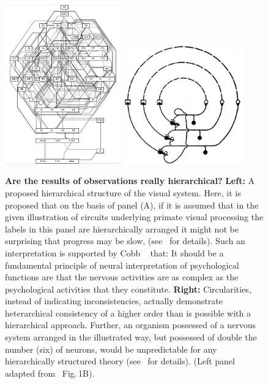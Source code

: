 \documentclass[10pt,letterpaper]{article}
\begin{document}
\begin{figure}[h!t]
  \begin{center}
  \vfill{}
    \includegraphics[width=0.45\textwidth]{figures/van-essen-primate-vision-circuit-grayscale.pdf}
    \includegraphics[width=0.45\textwidth]{figures/mcclelland-heterarchical-circuit.pdf}
  \end{center}
  \caption{{\bf Are the results of observations really hierarchical?}  \small{\bf{Left:}} A proposed hierarchical structure of the visual system.  Here, it is proposed that on the basis of panel (A), if it is assumed that in the given illustration of circuits underlying primate visual processing the labels in this panel are hierarchically arranged it might not be surprising that progress may be slow, (see~\cite{jonas17} for details). Such an interpretation is supported by Cobb ~\cite{cobb60} that: It should be a fundamental principle of neural interpretation of psychological functions are that the nervous activities are as complex as the psychological activities that they constitute.
    {\bf{Right:}} Circularities, instead of indicating inconsistencies, actually demonstrate heterarchical consistency of a higher order than is possible with a hierarchical approach. Further, an organism possessed of a nervous system arranged in the illustrated way, but possessed of double the number (six) of neurons, would be unpredictable for any hierarchically structured theory (see~\cite{mcculloch45a} for details).
    (Left panel adapted from~\cite{fraser21} Fig.\,1B).}
  \label{fig2}
\end{figure}
\end{document}
